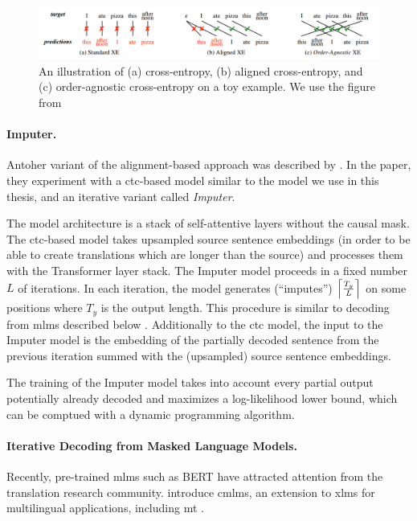 \begin{figure}
  \centering
  \includegraphics[width=\textwidth]{img/oaxe.png}

  \caption{An illustration of (a) cross-entropy, (b) aligned cross-entropy, and
    (c) order-agnostic cross-entropy on a toy example. We use the figure from
    \citet{du2021orderagnostic}}%
  \label{fig:oaxe-example}
\end{figure}


\paragraph{Imputer.} Antoher variant of the alignment-based approach was
described by \citet{saharia-etal-2020-non}. In the paper, they experiment with
a \acs{ctc}-based model similar to the model we use in this thesis, and an
iterative variant called \emph{Imputer}.

The model architecture is a stack of self-attentive layers without the causal
mask. The \acs{ctc}-based model takes upsampled source sentence embeddings (in
order to be able to create translations which are longer than the source) and
processes them with the Transformer layer stack.  The Imputer model proceeds in
a fixed number $L$ of iterations. In each iteration, the model generates
(``imputes'') $\ceil*{\frac{T_y}{L}}$ on some positions where $T_y$ is the
output length. This procedure is similar to decoding from \aclp{mlm} described
below . Additionally to the \ac{ctc} model, the input to the
Imputer model is the embedding of the partially decoded sentence from the
previous iteration summed with the (upsampled) source sentence embeddings.

The training of the Imputer model takes into account every partial output
potentially already decoded and maximizes a log-likelihood lower bound, which
can be comptued with a dynamic programming algorithm. 


\paragraph{Iterative Decoding from Masked Language Models.} Recently,
pre-trained \acp{mlm} such as BERT \citep{devlin-etal-2019-bert} have attracted
attention from the translation research
community. \citet{ghazvininejad-etal-2019-mask} introduce \acp{cmlm}, an
extension to \acp{xlm} for multilingual applications, including \ac{mt}
\citep{conneau-lample-2019-cross}.


